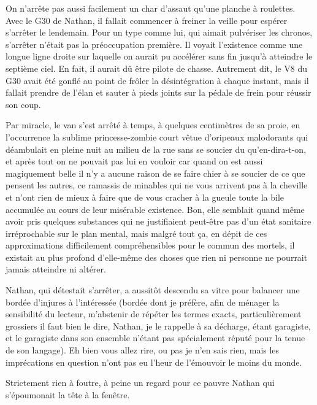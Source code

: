 On n’arrête pas aussi facilement un char d’assaut qu’une planche à roulettes. Avec le G30 de Nathan, il fallait commencer à freiner la veille pour espérer s’arrêter le lendemain. Pour un type comme lui, qui aimait pulvériser les chronos, s’arrêter n’était pas la préoccupation première. Il voyait l’existence comme une longue ligne droite sur laquelle on aurait pu accélérer sans fin jusqu’à atteindre le septième ciel. En fait, il aurait dû être pilote de chasse. Autrement dit, le V8 du G30 avait été gonflé au point de frôler la désintégration à chaque instant, mais il fallait prendre de l’élan et sauter à pieds joints sur la pédale de frein pour réussir son coup.

Par miracle, le van s’est arrêté à temps, à quelques centimètres de sa proie, en l’occurrence la sublime princesse-zombie court vêtue d’oripeaux malodorants qui déambulait en pleine nuit au milieu de la rue sans se soucier du qu’en-dira-t-on, et après tout on ne pouvait pas lui en vouloir car quand on est aussi magiquement belle il n’y a aucune raison de se faire chier à se soucier de ce que pensent les autres, ce ramassis de minables qui ne vous arrivent pas à la cheville et n’ont rien de mieux à faire que de vous cracher à la gueule toute la bile accumulée au cours de leur misérable existence. Bon, elle semblait quand même avoir pris quelques substances qui ne justifiaient peut-être pas d’un état sanitaire irréprochable sur le plan mental, mais malgré tout ça, en dépit de ces approximations difficilement compréhensibles pour le commun des mortels, il existait au plus profond d’elle-même des choses que rien ni personne ne pourrait jamais atteindre ni altérer.

Nathan, qui détestait s’arrêter, a aussitôt descendu sa vitre pour balancer une bordée d’injures à l’intéressée (bordée dont je préfère, afin de ménager la sensibilité du lecteur, m’abstenir de répéter les termes exacts, particulièrement grossiers il faut bien le dire, Nathan, je le rappelle à sa décharge, étant garagiste, et le garagiste dans son ensemble n’étant pas spécialement réputé pour la tenue de son langage). Eh bien vous allez rire, ou pas je n’en sais rien, mais les imprécations en question n’ont pas eu l’heur de l’émouvoir le moins du monde.

Strictement rien à foutre, à peine un regard pour ce pauvre Nathan qui s’époumonait la tête à la fenêtre.

